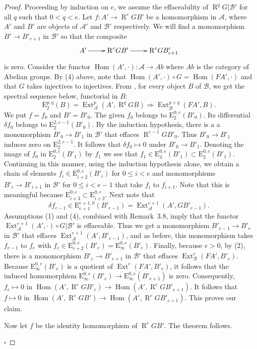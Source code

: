 \documentclass[10pt,twoside]{article}
\newcommand{\Hom}{{\operatorname{Hom}}}
\newcommand{\Ext}{{\operatorname{Ext}}}
\newcommand{\derived}{{\operatorname{R}}}
\newcommand{\qed}{\nopagebreak\par\hspace*{\fill}$\square$\par\vskip2mm}
\newtheorem{proof}{Proof}
\begin{document}
\begin{proof}%
Proceeding by induction on $e$, we
assume the effaceability of $\derived^qG|\mathcal{B'}$ 
for all $q$ such that $0<q<e$. Let $f:A' \to \derived^eGB'$ 
be a homomorphism in $\mathcal{A}$,  
where $A'$ and $B'$ are objects of  
$\mathcal{A'}$ and $\mathcal{B'}$ respectively. We will
find a monomorphism $B' \to B'_{e+1}$ in $\mathcal{B'}$ 
so that the composite   
$$
\xymatrix{A' \ar[r] & \derived^eGB' \ar[r] & \derived^eGB'_{e+1}
}
$$ 
is zero.
Consider the functor $\Hom(A', \cdot): \mathcal{A} \to Ab$ 
where $Ab$ is the category of Abelian groups. By (4) above,
note
 that $\Hom(A',\cdot)\circ G=\Hom(FA',\cdot)$ and that $G$
takes injectives to injectives.  From \cite{nori:Toh}, for every
object $B$ of  $\mathcal{B}$, 
we get the spectral sequence below, functorial in $B$:
$$\mathrm{E}^{p,q}_2(B)=\Ext^p_{\mathcal{A}}(A', \derived ^qGB) 
\Rightarrow \Ext^{p+q}_{\mathcal{B}}(FA',B).
$$
We put $f=f_0$ and $B'=B'_0$. 
The given $f_0$ belongs to $\mathrm{E}^{0,e}_2(B'_0)$. 
Its differential $\delta f_0$ belongs to $ \mathrm{E}^{2,{e-1}}_2(B'_0)$. 
By the induction hypothesis, there is a 
a monomorphism $B'_0 \to B'_1$ in $\mathcal{B'}$ 
 that effaces $\derived^{e-1}GB'_0$. Thus $B'_0 \to B'_1$     
induces zero on $\mathrm{E}^{2,e-1}_2$. It follows that 
$\delta f_0 \mapsto 0$ under $B'_0 \to B'_1$. Denoting the
image of $f_0$ in $\mathrm{E}^{0,e}_2(B'_1)$ by $f_1$ we
see that $f_1 \in \mathrm{E}^{0,e}_3(B'_1)       \subset
 \mathrm{E}^{0,e}_2(B'_1)$.
Continuing in this manner, using the induction hypothesis alone, 
we obtain a chain of elements 
$f_i \in \mathrm{E}^{0,e}_{i+2}(B'_i)$ for $0 \leq i <e$ 
and monomorphisms $B'_i \to B'_{i+1}$ 
in $\mathcal{B'}$ 
for $0 \leq i < e-1$  that take  
 $f_i$ to $f_{i+1}$. Note that  this is meaningful because    
$\mathrm{E}^{0,e}_{i+3} \subset \mathrm{E}^{0,e}_{i+2}$. 
 Next note that 
$$
\delta f_{e-1} \in \mathrm{E}^{e+1,0}_{e+1}(B'_{e-1})
=\Ext^{e+1}_{\mathcal{A}}(A', GB'_{e-1}).
$$ 
Assumptions (1) and (4), combined
with Remark~3.8, imply that the functor 
$\Ext_{\mathcal{A}}^{e+1}(A', \cdot) \circ G|\mathcal{B'}$
 is effaceable. Thus we get a monomorphism  
  $B'_{e-1} \to B'_e$ in $\mathcal{B'}$
that effaces  $\Ext^{e+1}_{\mathcal{A}}(A', B'_{e-1})$, and
as before, this monomorphism takes  $f_{e-1}$ to $f_e$ with 
$f_e \in  \mathrm{E}^{0,e}_{e+2}(B'_e)= 
\mathrm{E}^{0,e}_{\infty}(B'_e)$.
Finally, because $e>0$, by (2), there
is a monomorphism $B'_e \to B'_{e+1}$ in $\mathcal{B'}$  
that effaces
 $\Ext^e_{\mathcal{B}}(FA',B'_e)$. Because  
 $  \mathrm{E}^{0,e}_{\infty}(B'_e)$ is a quotient of
 $\Ext^e(FA', B'_e)$, it follows that the induced homomorphism
$\mathrm{E}^{0,e}_{\infty}(B'_e) \to  
\mathrm{E}^{0,e}_{\infty}(B'_{e+1})$ is zero. Consequently, 
$f_e \mapsto 0$ in $\Hom(A', \derived^eGB'_e) \to
 \Hom(A', \derived^e GB'_{e+1})$. It follows that 
 $f \mapsto 0$ in $\Hom(A', \derived^eGB') \to
 \Hom(A', \derived^e GB'_{e+1})$. This 
proves our claim. 
 
Now let $f$ be the identity
homomorphism of  $ \derived^eGB'$. The theorem follows.
\qed\end{proof}
\end{document}
